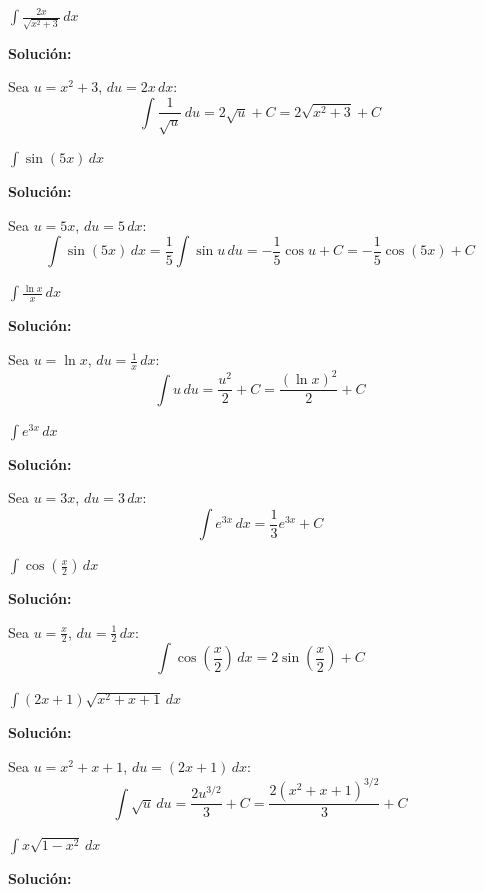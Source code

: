 \documentclass[12pt, a4paper]{book}
\begin{document}
\begin{ejercicio}
$\int \frac{2x}{\sqrt{x^2 + 3}} \, dx$
\end{ejercicio}

\textbf{Solución:}

Sea $u = x^2 + 3$, $du = 2x \, dx$:
\[
\int \frac{1}{\sqrt{u}} \, du = 2\sqrt{u} + C = 2\sqrt{x^2+3} + C
\]

\begin{ejercicio}
$\int \sin(5x) \, dx$
\end{ejercicio}

\textbf{Solución:}

Sea $u = 5x$, $du = 5 \, dx$:
\[
\int \sin(5x) \, dx = \frac{1}{5} \int \sin u \, du = -\frac{1}{5}\cos u + C = -\frac{1}{5}\cos(5x) + C
\]

\begin{ejercicio}
$\int \frac{\ln x}{x} \, dx$
\end{ejercicio}

\textbf{Solución:}

Sea $u = \ln x$, $du = \frac{1}{x} \, dx$:
\[
\int u \, du = \frac{u^2}{2} + C = \frac{(\ln x)^2}{2} + C
\]

\begin{ejercicio}
$\int e^{3x} \, dx$
\end{ejercicio}

\textbf{Solución:}

Sea $u = 3x$, $du = 3 \, dx$:
\[
\int e^{3x} \, dx = \frac{1}{3}e^{3x} + C
\]

\begin{ejercicio}
$\int \cos(\frac{x}{2}) \, dx$
\end{ejercicio}

\textbf{Solución:}

Sea $u = \frac{x}{2}$, $du = \frac{1}{2} \, dx$:
\[
\int \cos(\frac{x}{2}) \, dx = 2\sin(\frac{x}{2}) + C
\]

\begin{ejercicio}
$\int (2x+1)\sqrt{x^2+x+1} \, dx$
\end{ejercicio}

\textbf{Solución:}

Sea $u = x^2+x+1$, $du = (2x+1) \, dx$:
\[
\int \sqrt{u} \, du = \frac{2u^{3/2}}{3} + C = \frac{2(x^2+x+1)^{3/2}}{3} + C
\]

\begin{ejercicio}
$\int x\sqrt{1-x^2} \, dx$
\end{ejercicio}

\textbf{Solución:}
\end{document}
